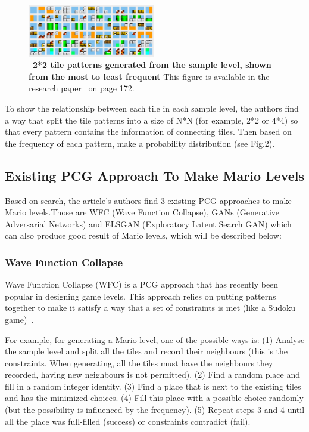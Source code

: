 \documentclass[runningheads]{llncs}
\begin{document}
\begin{figure}
\includegraphics[width=0.5\textwidth]{Figure2.eps}
\centering
\caption{ ~\textbf{2*2 tile patterns generated from the sample level, shown from the most to least frequent} This figure is available in the research paper~\cite{ref_lncs1} on page 172.} \label{Figure2}
\end{figure}

To show the relationship between each tile in each sample level, the authors find a way that split the tile patterns into a size of N*N (for example, 2*2 or 4*4) so that every pattern contains the information of connecting tiles. Then based on the frequency of each pattern, make a probability distribution (see Fig.2).




\subsection{Existing PCG Approach To Make Mario Levels}
Based on search, the article's authors find 3 existing PCG approaches to make Mario levels.Those are WFC (Wave Function Collapse), GANs (Generative Adversarial Networks) and ELSGAN (Exploratory Latent Search GAN) which can also produce good result of Mario levels, which will be described below:

\subsubsection{Wave Function Collapse}
Wave Function Collapse (WFC) is a PCG approach that has recently been popular in designing game levels. This approach relies on putting patterns together to make it satisfy a way that a set of constraints is met (like a Sudoku game)~\cite{ref_article1}. 

For example, for generating a Mario level, one of the possible ways is: (1) Analyse the sample level and split all the tiles and record their neighbours (this is the constraints. When generating, all the tiles must have the neighbours they recorded, having new neighbours is not permitted). (2) Find a random place and fill in a random integer identity. (3) Find a place that is next to the existing tiles and has the minimized choices. (4) Fill this place with a possible choice randomly (but the possibility is influenced by the frequency). (5) Repeat steps 3 and 4 until all the place was full-filled (success) or constraints contradict (fail).
\end{document}
